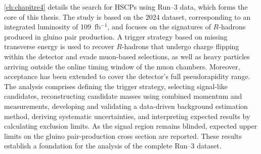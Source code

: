 \cref{ch:chapitre4} details the search for HSCPs using Run--3 data, which forms the core of this thesis. The study is based on the 2024 dataset, corresponding to an integrated luminosity of 109~fb$^{-1}$, and focuses on the signatures of $R$-hadrons produced in gluino pair production. A trigger strategy based on missing transverse energy is used to recover $R$-hadrons that undergo charge flipping within the detector and evade muon-based selections, as well as heavy particles arriving outside the online timing window of the muon chambers. Moreover, acceptance has been extended to cover the detector's full pseudorapidity range. The analysis comprises defining the trigger strategy, selecting signal-like candidates, reconstructing candidate masses using combined momentum and \dedx{} measurements, developing and validating a data-driven background estimation method, deriving systematic uncertainties, and interpreting expected results by calculating exclusion limits. As the signal region remains blinded, expected upper limits on the gluino pair-production cross section are reported. These results establish a foundation for the analysis of the complete Run--3 dataset.